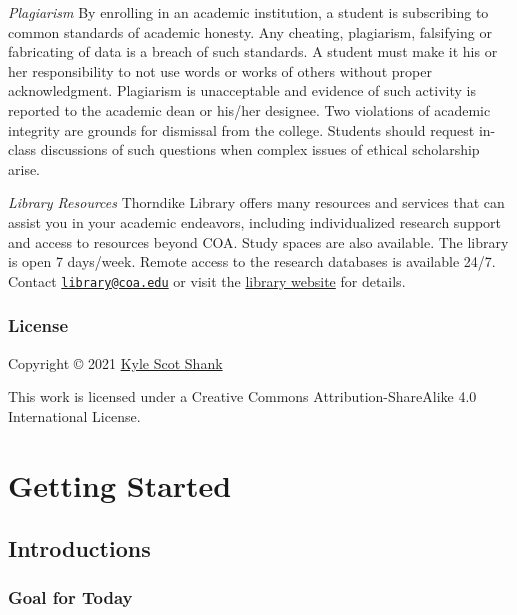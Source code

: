\documentclass[
]{book}
\begin{document}
\emph{Plagiarism}
By enrolling in an academic institution, a student is subscribing to common standards of academic honesty. Any cheating, plagiarism, falsifying or fabricating of data is a breach of such standards. A student must make it his or her responsibility to not use words or works of others without proper acknowledgment. Plagiarism is unacceptable and evidence of such activity is reported to the academic dean or his/her designee. Two violations of academic integrity are grounds for dismissal from the college. Students should request in-class discussions of such questions when complex issues of ethical scholarship arise.

\emph{Library Resources}
Thorndike Library offers many resources and services that can assist you in your academic endeavors, including individualized research support and access to resources beyond COA. Study spaces are also available. The library is open 7 days/week. Remote access to the research databases is available 24/7. Contact \href{mailto:library@coa.edu}{\nolinkurl{library@coa.edu}} or visit the \href{www.coa.edu/library}{library website} for details.

\hypertarget{license}{%
\section*{License}\label{license}}

Copyright © 2021 \href{https://github.com/kylescotshank}{Kyle Scot Shank}

This work is licensed under a Creative Commons Attribution-ShareAlike 4.0 International License.

\hypertarget{part-getting-started}{%
\part{Getting Started}\label{part-getting-started}}

\hypertarget{introductions}{%
\chapter{Introductions}\label{introductions}}

\hypertarget{goal-for-today}{%
\section*{Goal for Today}\label{goal-for-today}}
\end{document}

